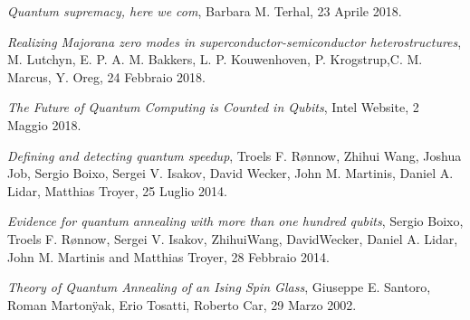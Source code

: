 \begin{thebibliography}{99}
    \textit{Quantum supremacy, here we com},
    Barbara M. Terhal,
    23 Aprile 2018.

    \textit{Realizing Majorana zero modes in superconductor-semiconductor heterostructures},
    M. Lutchyn, E. P. A. M. Bakkers, L. P. Kouwenhoven, P. Krogstrup,C. M. Marcus, Y. Oreg,
    24 Febbraio 2018.

    \textit{The Future of Quantum Computing is Counted in Qubits},
    Intel Website,
    2 Maggio 2018.

    \textit{Defining and detecting quantum speedup},
    Troels F. Rønnow, Zhihui Wang, Joshua Job, Sergio Boixo, Sergei V. Isakov, David Wecker, John M. Martinis, Daniel A. Lidar, Matthias Troyer,
    25 Luglio 2014.

    \textit{Evidence for quantum annealing with more than
one hundred qubits},
    Sergio Boixo, Troels F. Rønnow, Sergei V. Isakov, ZhihuiWang, DavidWecker, Daniel A. Lidar, John M. Martinis and Matthias Troyer,
    28 Febbraio 2014.

    \textit{Theory of Quantum Annealing of an Ising Spin Glass},
    Giuseppe E. Santoro, Roman Martonÿak, Erio Tosatti, Roberto Car,
    29 Marzo 2002.

\end{thebibliography}
